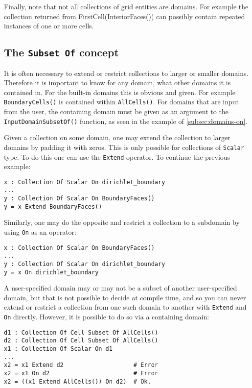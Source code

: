 \documentclass[11pt]{article}
\newcommand{\code}[1]{\texttt{#1}}
\begin{document}
Finally, note that not all collections of grid entities are domains. For example the
collection returned from FirstCell(InteriorFaces()) can possibly contain repeated
instances of one or more cells.

\subsection{The \code{Subset Of} concept}
\label{subsec:subset-of}

It is often necessary to extend or restrict collections to larger or smaller
domains. Therefore it is important to know for any domain, what other domains it is
contained in. For the built-in domains this is obvious and given. For example
\code{BoundaryCells()} is contained within \code{AllCells()}. For domains that are input
from the user, the containing domain must be given as an argument to the
\code{InputDomainSubsetOf()} function, as seen in the example of \ref{subsec:domains-on}.

Given a collection on some domain, one may extend the collection to larger domains by
padding it with zeros. This is only possible for collections of \code{Scalar} type. To do
this one can use the \code{Extend} operator. To continue the previous example:

\code{x : Collection Of Scalar On dirichlet\_boundary\\
... \\
y : Collection Of Scalar On BoundaryFaces()\\
y = x Extend BoundaryFaces()
}

Similarly, one may do the opposite and restrict a collection to a subdomain by using
\code{On} as an operator:

\code{x : Collection Of Scalar On BoundaryFaces()\\
... \\
y : Collection Of Scalar On dirichlet\_boundary\\ 
y = x On dirichlet\_boundary
}

A user-specified domain may or may not be a subset of another user-specified domain, but
that is not possible to decide at compile time, and so you can never extend or restrict a
collection from one such domain to another with \code{Extend} and \code{On}
directly. However, it is possible to do so via a containing domain:

\begin{verbatim}
d1 : Collection Of Cell Subset Of AllCells()
d2 : Collection Of Cell Subset Of AllCells()
x1 : Collection Of Scalar On d1
...
x2 = x1 Extend d2                    # Error
x2 = x1 On d2                        # Error
x2 = ((x1 Extend AllCells()) On d2)  # Ok.
\end{verbatim}
\end{document}
